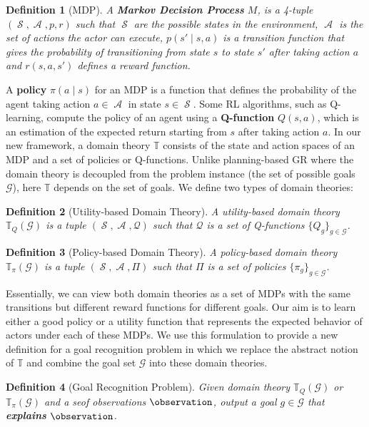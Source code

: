 \documentclass[letterpaper]{article}
\DeclareMathOperator{\statespace}{\mathcal{S}}
\DeclareMathOperator{\actionspace}{\mathcal{A}}
\providecommand\theory{\mathbb{T}}
\providecommand\goals{\mathcal{G}}
\newtheorem{definition}{Definition}
\begin{document}
\begin{definition}[MDP]
A \textbf{Markov Decision Process} $M$, is a 4-tuple $(\statespace, \actionspace, p, r)$ such that $\statespace$ are the possible states in the environment, $\actionspace$ is the set of actions the actor can execute, $p(s' \mid s, a)$ is a transition function that gives the probability of transitioning from state $s$ to state $s'$ after taking action $a$ and $r(s, a, s')$ defines a reward function.
\end{definition}

A \textbf{policy} $\pi(a \mid s)$ for an MDP is a function that defines the probability of the agent taking action $a \in \actionspace$ in state $s \in \statespace$.
Some RL algorithms, such as Q-learning, compute the policy of an agent using a \textbf{Q-function} $Q(s,a)$, which is an estimation of the expected return starting from $s$ after taking action $a$. %
In our new framework, a domain theory $\theory$ consists of the state and action spaces of an MDP and a set of policies or Q-functions.
Unlike planning-based GR where the domain theory is decoupled from the problem instance (the set of possible goals $\goals$), here $\theory$ depends on the set of goals.
We define two types of domain theories:

\begin{definition}[Utility-based Domain Theory]
A utility-ba\-sed domain theory $\theory_Q(\goals)$ is a tuple $(\statespace, \actionspace, \mathcal{Q})$ such that $\mathcal{Q}$ is a set of Q-functions $\{Q_g\}_{g \in \goals}$.
\end{definition}

\begin{definition}[Policy-based Domain Theory]
A policy-ba\-sed domain theory $\theory_{\pi}(\goals)$ is a tuple $(\statespace, \actionspace, \Pi)$ such that $\Pi$ is a set of policies $\{\pi_g\}_{g \in \goals}$.
\end{definition}

Essentially, we can view both domain theories as a set of MDPs with the same transitions but different reward functions for different goals.
Our aim is to learn either a good policy or a utility function that represents the expected behavior of actors under each of these MDPs.
We use this formulation to provide a new definition for a goal recognition problem in which we replace the abstract notion of $\theory$ and combine the goal set $\goals$ into these domain theories.

\begin{definition}[Goal Recognition Problem]
%
%
%
Given domain theory $\theory_Q(\goals)$ or $\theory_{\pi}(\goals)$ and a seof observations $\observation$, output a goal $g\in \goals$ that \textbf{explains} $\observation$.
\end{definition}
\end{document}
